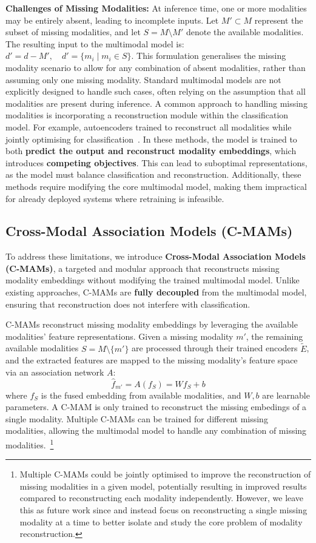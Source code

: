 \textbf{Challenges of Missing Modalities:} At inference time, one or more modalities may be entirely absent, leading to incomplete inputs. Let \( M' \subset M \) represent the subset of missing modalities, and let \( S = M \setminus M' \) denote the available modalities. The resulting input to the multimodal model is: $d' = d - M', \quad d' = \{ m_i \mid m_i \in S \}$.
This formulation generalises the missing modality scenario to allow for any combination of absent modalities, rather than assuming only one missing modality. Standard multimodal models are not explicitly designed to handle such cases, often relying on the assumption that all modalities are present during inference. A common approach to handling missing modalities is incorporating a reconstruction module within the classification model. For example, autoencoders trained to reconstruct all modalities while jointly optimising for classification~\cite{zhao-etal-2021-missing,redcore}. In these methods, the model is trained to both \textbf{predict the output and reconstruct modality embeddings}, which introduces \textbf{competing objectives}. This can lead to suboptimal representations, as the model must balance classification and reconstruction. Additionally, these methods require modifying the core multimodal model, making them impractical for already deployed systems where retraining is infeasible.

\subsection{Cross-Modal Association Models (C-MAMs)}
To address these limitations, we introduce \textbf{Cross-Modal Association Models (C-MAMs)}, a targeted and modular approach that reconstructs missing modality embeddings without modifying the trained multimodal model. Unlike existing approaches, C-MAMs are \textbf{fully decoupled} from the multimodal model, ensuring that reconstruction does not interfere with classification.

C-MAMs reconstruct missing modality embeddings by leveraging the available modalities' feature representations. Given a missing modality $m'$, the remaining available modalities $S = M \setminus \{m'\}$ are processed through their trained encoders $\tilde{E}$, and the extracted features are mapped to the missing modality’s feature space via an association network $A$:
\begin{equation*}
\hat{f}_{m'} = A(f_S) = W f_S + b
\end{equation*}
where $f_S$ is the fused embedding from available modalities, and $W, b$ are learnable parameters. A C-MAM is only trained to reconstruct the missing embedings of a single modality. Multiple C-MAMs can be trained for different missing modalities, allowing the multimodal model to handle any combination of missing modalities.~\footnote{Multiple C-MAMs could be jointly optimised to improve the reconstruction of missing modalities in a given model, potentially resulting in improved results compared to reconstructing each modality independently. However, we leave this as future work since and instead focus on reconstructing a single missing modality at a time to better isolate and study the core problem of modality reconstruction.}



